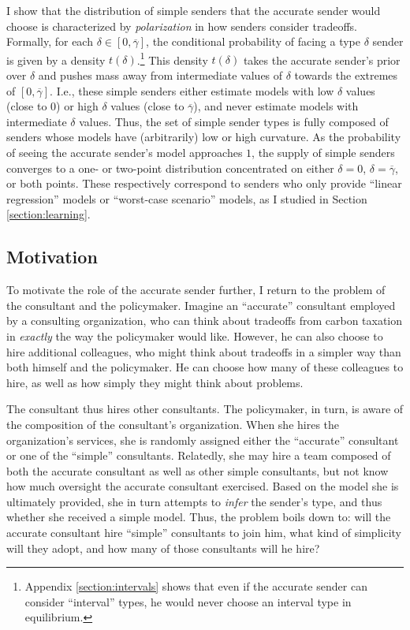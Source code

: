 \documentclass[11pt,dvipsnames]{article}
\begin{document}
I show that the distribution of simple senders that the accurate sender would choose is characterized by \emph{polarization} in how senders consider tradeoffs.
Formally, for each $\delta \in [0,\overline{\gamma}]$, the conditional probability of facing a type $\delta$ sender is given by a density $t(\delta)$.\footnote{Appendix \ref{section:intervals} shows that even if the accurate sender can consider ``interval'' types, he would never choose an interval type in equilibrium.}
This density $t(\delta)$ takes the accurate sender's prior over $\delta$ and pushes mass away from intermediate values of $\delta$ towards the extremes of $[0,\overline{\gamma}]$.
I.e., these simple senders either estimate models with low $\delta$ values (close to $0$) or high $\delta$ values (close to $\overline{\gamma}$), and never estimate models with intermediate $\delta$ values.
Thus, the set of simple sender types is fully composed of senders whose models have (arbitrarily) low or high curvature.
As the probability of seeing the accurate sender's model approaches $1$, the supply of simple senders converges to a one- or two-point distribution concentrated on either $\delta = 0$, $\delta = \overline{\gamma}$, or both points.
These respectively correspond to senders who only provide ``linear regression'' models or ``worst-case scenario'' models, as I studied in Section \ref{section:learning}.

\subsection{Motivation}

To motivate the role of the accurate sender further, I return to the problem of the consultant and the policymaker.
Imagine an ``accurate'' consultant employed by a consulting organization, who can think about tradeoffs from carbon taxation in \emph{exactly} the way the policymaker would like.
However, he can also choose to hire additional colleagues, who might think about tradeoffs in a simpler way than both himself and the policymaker.
He can choose how many of these colleagues to hire, as well as how simply they might think about problems.

The consultant thus hires other consultants. The policymaker, in turn, is aware of the composition of the consultant's organization.
When she hires the organization's services, she is randomly assigned either the ``accurate'' consultant or one of the ``simple'' consultants.
Relatedly, she may hire a team composed of both the accurate consultant as well as other simple consultants, but not know how much oversight the accurate consultant exercised.
Based on the model she is ultimately provided, she in turn attempts to \emph{infer} the sender's type, and thus whether she received a simple model.
Thus, the problem boils down to: will the accurate consultant hire ``simple'' consultants to join him, what kind of simplicity will they adopt, and how many of those consultants will he hire?
\end{document}
